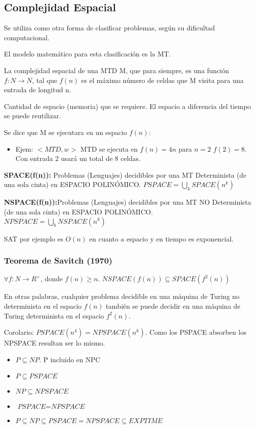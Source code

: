 \subsection{Complejidad Espacial}
Se utiliza como otra forma de clasificar problemas, según su dificultad computacional.

El modelo matemático para esta clasificación es la MT.

La complejidad espacial de una MTD M, que para siempre, es una función $f: N \rightarrow N$, tal que $f(n)$ es el máximo número de celdas que M visita para una entrada de longitud n.

Cantidad de espacio (memoria) que se requiere. El espacio a diferencia del tiempo se puede reutilizar.

Se dice que M se ejecutara en un espacio $f(n)$:
\begin{itemize}
  \item Ejem: $<MTD, w>$ MTD se ejecuta en $f(n)=4n$ para $n=2$ $f(2)=8$. Con entrada 2 usará un total de 8 celdas. 
\end{itemize}

\textbf{SPACE(f(n)):} Problemas (Lenguajes) decidibles por una MT Determinista (de una sola cinta) en ESPACIO POLINÓMICO. $PSPACE=\bigcup_k SPACE(n^k)$

\textbf{NSPACE(f(n)):}Problemas (Lenguajes) decidibles por una MT NO Determinista (de una sola cinta) en ESPACIO POLINÓMICO. $NPSPACE=\bigcup_k NSPACE(n^k)$

SAT por ejemplo es $O(n)$ en cuanto a espacio y en tiempo es exponencial.

\subsubsection{Teorema de Savitch (1970)}
$\forall f: N \rightarrow R^+$, donde $f(n)\geq n$. $\textit{NSPACE}(f(n)) \subseteq \textit{SPACE}(f^2(n))$

En otras palabras, cualquier problema decidible en una máquina de Turing no determinista en el espacio $f(n)$ también se puede decidir en una máquina de Turing determinista en el espacio $f^2(n)$.

Corolario: $\textit{PSPACE}(n^4)=\textit{NPSPACE}(n^k)$. Como los PSPACE absorben los NPSPACE resultan ser lo mismo.
\begin{itemize}
  \item $P \subseteq NP$. P incluido en NPC
  \item $P \subseteq \textit{PSPACE}$
  \item $NP \subseteq \textit{NPSPACE}$
  \item $\textit{PSPACE} = \textit{NPSPACE}$
  \item $P \subseteq NP \subseteq \textit{PSPACE}=\textit{NPSPACE} \subseteq \textit{EXPTIME}$
\end{itemize}